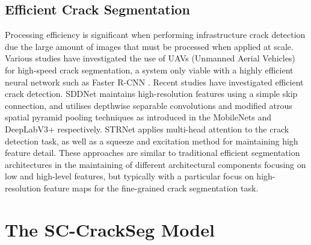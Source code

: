 \documentclass[a4paper,12pt]{report}
\begin{document}
    \subsection{Efficient Crack Segmentation}
    Processing efficiency is significant when performing infrastructure crack detection due the large amount of images that must be processed when applied at scale. Various studies \cite{kerle_uav-based_2020} \cite{kang_autonomous_2018} have investigated the use of UAVs (Unmanned Aerial Vehicles) for high-speed crack segmentation, a system only viable with a highly efficient neural network such as Faster R-CNN \cite{ali_real-time_2021}. Recent studies have investigated efficient crack detection. SDDNet \cite{choi_sddnet_2019} maintains high-resolution features using a simple skip connection, and utilises depthwise separable convolutions and modified atrous spatial pyramid pooling techniques as introduced in the MobileNets \cite{howard2017mobilenets} and DeepLabV3+ \cite{chen_rethinking_2017} respectively. STRNet \cite{kang_efficient_2021} applies multi-head attention to the crack detection task, as well as a squeeze and excitation method for maintaining high feature detail. 
    These approaches are similar to traditional efficient segmentation architectures in the maintaining of different architectural components focusing on low and high-level features, but typically with a particular focus on high-resolution feature maps for the fine-grained crack segmentation task.


\section{The SC-CrackSeg Model}


\end{document}
